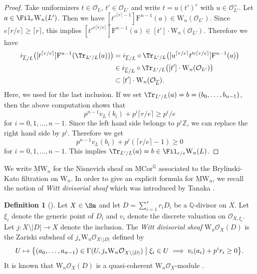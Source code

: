\documentclass{amsart}
\theoremstyle{plain}
\theoremstyle{definition}
\newtheorem{definition}[theorem]{Definition}
\theoremstyle{remark}
\numberwithin{equation}{section}
\def\ceil#1{\lceil #1 \rceil}
\def\MCor{\mathrm{\underline{M}Cor}}
\def\MW{\underline{\mathrm{M}}\mathrm{W}}
\begin{document}
\begin{proof}
	Take uniformizers $t\in \mathcal{O}_L$, $t'\in \mathcal{O}_{L'}$ and write $t=u(t')^e$ with $u\in \mathcal{O}_{L'}^\times$.
	Let $a\in \Fil_r \mathrm{W}_n(L')$.
	Then we have $[t'^{\ceil{r}-1}]\mathrm{F}^{n-1}(a)\in \mathrm{W}_n(\mathcal{O}_{L'})$.
	Since $e\ceil{r/e}\geq \ceil{r}$, this implies $[t'^{e\ceil{r/e}}]\mathrm{F}^{n-1}(a)\in [t']\cdot \mathrm{W}_n(\mathcal{O}_{L'})$.
        Therefore we have
	\begin{align*}
		i_{\overline{L}/L}\bigl([t^{\ceil{r/e}}]\mathrm{F}^{n-1}(\Tr_{L'/L}(a))\bigr)
		&{}=i_{\overline{L}/L}\circ\Tr_{L'/L}\bigl([u^{\ceil{r/e}}t'^{e\ceil{r/e}}]\mathrm{F}^{n-1}(a)\bigr)\\
		&{}\in i_{\overline{L}/L}\circ \Tr_{L'/L}\bigl([t']\cdot \mathrm{W}_n(\mathcal{O}_{L'})\bigl)\\
            &{}\subset [t']\cdot \mathrm{W}_n(\mathcal{O}_{\overline{L}}).
	\end{align*}
        Here, we used  for the last inclusion.
	If we set $\Tr_{L'/L}(a)=b=(b_0,\dots,b_{n-1})$, then the above computation shows that
	$$
		p^{n-1}v_L(b_i) + p^i \ceil{r/e}\geq p^i/e
	$$
	for $i=0,1,\dots,n-1$.
	Since the left hand side belongs to $p^i\mathbb{Z}$, we can replace the right hand side by $p^i$.
        Therefore we get
	$$
		p^{n-1}v_L(b_i)+p^i(\ceil{r/e}-1)\geq 0
	$$
	for $i=0,1,\dots,n-1$.
	This implies $\Tr_{L'/L}(a)=b\in \Fil_{r/e}\mathrm{W}_n(L)$.
\end{proof}

We write $\MW_n$ for the Nisnevich sheaf on $\MCor^\mathbb{Q}$ associated to the Brylinski-Kato filtration on $\mathrm{W}_n$.
In order to give an explicit formula for $\MW_n$, we recall the notion of \emph{Witt divisorial sheaf} which was introduced by Tanaka \cite{Tanaka_Witt}.

\begin{definition}[{\cite[Definition 3.1]{Tanaka_Witt}}]
	Let $X\in \Sm$ and let $D=\sum_{i=1}^s r_i D_i$ be a $\mathbb{Q}$-divisor on $X$.
	Let $\xi_i$ denote the generic point of $D_i$ and $v_i$ denote the discrete valuation on $\mathcal{O}_{X,\xi_i}$.
	Let $j\colon X\setminus|D|\to X$ denote the inclusion.
	The \emph{Witt divisorial sheaf} $\mathrm{W}_n\mathcal{O}_X(D)$ is the Zariski subsheaf of $j_*\mathrm{W}_n\mathcal{O}_{X\setminus |D|}$ defined by
	$$
		U\mapsto \bigl\{(a_0,\dots,a_{n-1})\in \Gamma(U, j_*\mathrm{W}_n\mathcal{O}_{X\setminus|D|})\bigm| \xi_i\in U\implies v_i(a_i)+p^i r_i\geq 0\bigr\}.
	$$
	It is known that $\mathrm{W}_n\mathcal{O}_X(D)$ is a quasi-coherent $\mathrm{W}_n\mathcal{O}_X$-module \cite[Lemma 3.5 (2)]{Tanaka_Witt}.
\end{definition}
\end{document}
